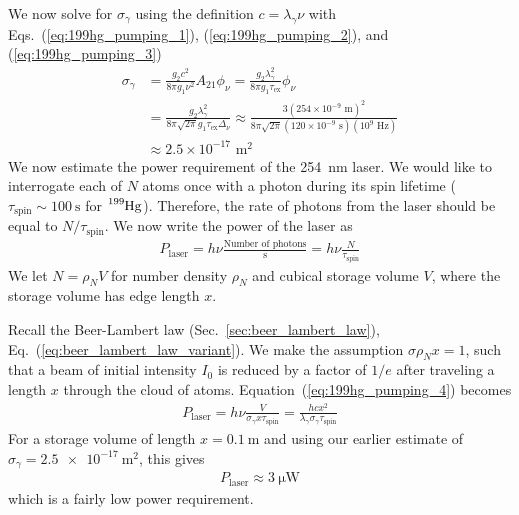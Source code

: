We now solve for $\sigma_\gamma$ using the definition $c=\lambda_\gamma \nu$ with Eqs.~(\ref{eq:199hg_pumping_1}), (\ref{eq:199hg_pumping_2}), and (\ref{eq:199hg_pumping_3})
%
\begin{align}
    \sigma_\gamma &= \frac{g_2 c^2}{8\pi g_1 \nu^2}A_{21}\phi_\nu = \frac{g_2 \lambda_\gamma^2}{8\pi g_1 \tau_\text{ex}}\phi_\nu \\
    &= \frac{g_2 \lambda_\gamma^2}{8\pi \sqrt{2\pi} g_1 \tau_\text{ex}\Delta_\nu} \approx \frac{3 (254\times 10^{-9} \text{ m})^2}{8\pi\sqrt{2\pi} (120\times 10^{-9}\text{ s})(10^9\text{ Hz})} \\
    &\approx 2.5 \times 10^{-17} \text{ m}^2
\end{align}
%
We now estimate the power requirement of the \qty{254}{\nano\meter} laser. We would like to interrogate each of $N$ atoms once with a photon during its spin lifetime ($\tau_\text{spin}\sim \qty{100}{\s}$ for $\ce{^199Hg}$). Therefore, the rate of photons from the laser should be equal to $N/\tau_\text{spin}$. We now write the power of the laser as
%
\begin{gather}
    P_\text{laser}=h\nu \frac{\text{Number of photons}}{\text{s}}=h\nu\frac{N}{\tau_\text{spin}}\label{eq:199hg_pumping_4}
\end{gather}
%
We let $N=\rho_N V$ for number density $\rho_N$ and cubical storage volume $V$, where the storage volume has edge length $x$.

Recall the Beer-Lambert law (Sec.~\ref{sec:beer_lambert_law}), Eq.~(\ref{eq:beer_lambert_law_variant}). We make the assumption $\sigma \rho_N x=1$, such that a beam of initial intensity $I_0$ is reduced by a factor of $1/e$ after traveling a length $x$ through the cloud of atoms. Equation~(\ref{eq:199hg_pumping_4}) becomes
%
\begin{gather}
    P_\text{laser}=h\nu \frac{V}{\sigma_\gamma x \tau_\text{spin}} = \frac{hcx^2}{\lambda_\gamma \sigma_\gamma \tau_\text{spin}}
\end{gather}
%
For a storage volume of length $x=\qty{0.1}{\meter}$ and using our earlier estimate of $\sigma_\gamma=\qty{2.5e-17}{\meter^2}$, this gives
%
\begin{gather}
    P_\text{laser}\approx \qty{3}{\micro\watt}
\end{gather}
%
which is a fairly low power requirement.